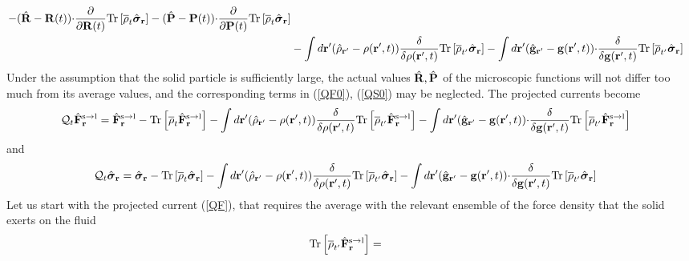 \documentclass[b5paper,openright,11pt]{book}
\begin{document}
\begin{appendices}
\begin{align}
-(\hat{\bf R}-{\bf R}(t)){\cdot}\frac{\partial}{\partial {\bf R}(t)}
{\rm Tr}\left[\overline{\rho}_{t} \hat{\boldsymbol{\sigma}}_{{\bf r}}\right]
-(\hat{\bf P}-{\bf P}(t)){\cdot}\frac{\partial}{\partial {\bf P}(t)}
{\rm Tr}\left[\overline{\rho}_{t} \hat{\boldsymbol{\sigma}}_{{\bf r}}\right]
\nonumber\\
&-\int d{\bf r}'(\hat{\rho}_{{\bf r}'}-\rho({\bf r}',t))
\frac{\delta}{\delta \rho({\bf r}',t)}{\rm Tr}\left[\overline{\rho}_{t'}\hat{\boldsymbol{\sigma}}_{{\bf r}}\right]
-\int d{\bf r}'(\hat{\bf g}_{{\bf r}'}-{\bf g}({\bf r}',t))
{\cdot}\frac{\delta}{\delta {\bf g}({\bf r}',t)}{\rm Tr}\left[\overline{\rho}_{t'}  \hat{\boldsymbol{\sigma}}_{{\bf r}}\right]
\label{QS0}
\end{align}
Under the  assumption that the  solid particle is  sufficiently large,
the  actual  values  $\hat{\bf  R},\hat{\bf  P}$  of  the  microscopic
functions will  not differ too much  from its average values,  and the
corresponding terms in (\ref{QF0}), (\ref{QS0}) may be neglected. The projected
currents become
\begin{align}
  {\cal Q}_t\hat{\bf F}^{\rm s\to l}_{{\bf r}}&=
\hat{\bf F}^{\rm s\to l}_{{\bf r}}- {\rm Tr}\left[\overline{\rho}_{t} \hat{\bf F}^{\rm s\to l}_{{\bf r}}\right]
-\int d{\bf r}'(\hat{\rho}_{{\bf r}'}-\rho({\bf r}',t))
\frac{\delta}{\delta \rho({\bf r}',t)}{\rm Tr}\left[\overline{\rho}_{t'}  \hat{\bf F}^{\rm s\to l}_{{\bf r}}\right]
-\int d{\bf r}'(\hat{\bf g}_{{\bf r}'}-{\bf g}({\bf r}',t)){\cdot}
\frac{\delta}{\delta {\bf g}({\bf r}',t)}{\rm Tr}\left[\overline{\rho}_{t'}  \hat{\bf F}^{\rm s\to l}_{{\bf r}}\right]
\label{QF}
\end{align}
and 
\begin{align}
  {\cal Q}_t\hat{\boldsymbol{\sigma}}_{{\bf r}}&=
\hat{\boldsymbol{\sigma}}_{{\bf r}}- {\rm Tr}\left[\overline{\rho}_{t} \hat{\boldsymbol{\sigma}}_{{\bf r}}\right]
-\int d{\bf r}'(\hat{\rho}_{{\bf r}'}-\rho({\bf r}',t))
\frac{\delta}{\delta \rho({\bf r}',t)}{\rm Tr}\left[\overline{\rho}_{t'}\hat{\boldsymbol{\sigma}}_{{\bf r}}\right]
-\int d{\bf r}'(\hat{\bf g}_{{\bf r}'}-{\bf g}({\bf r}',t))
{\cdot}
\frac{\delta}{\delta {\bf g}({\bf r}',t)}{\rm Tr}\left[\overline{\rho}_{t'}  \hat{\boldsymbol{\sigma}}_{{\bf r}}\right]
\label{QS1}
\end{align}
Let us start with the  projected current (\ref{QF}), that requires the
average with the relevant ensemble of the force density that the solid
exerts on the fluid
\begin{align}
  {\rm Tr}\left[\overline{\rho}_{t'}  \hat{\bf F}^{\rm s\to l}_{{\bf r}}\right]&=

\end{align}
\end{appendices}
\end{document}
